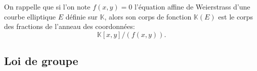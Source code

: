 \documentclass[10pt,a4paper]{book}
\theoremstyle{plain}
\theoremstyle{definition}
\theoremstyle{definition}
\theoremstyle{definition}
\theoremstyle{definition}
\theoremstyle{remark}
\theoremstyle{remark}
\begin{document}
On rappelle que si l'on note $f(x,y)=0$ l'équation affine de Weierstrass d'une courbe elliptique $E$ définie sur $\mathbb{K}$, alors son corps de fonction $\mathbb{K}(E)$ est le corps des fractions de l'anneau des coordonnées:
\begin{equation*}
\mathbb{K}[x,y]/(f(x,y)).
\end{equation*}

\subsection{Loi de groupe}
%
\end{document}
